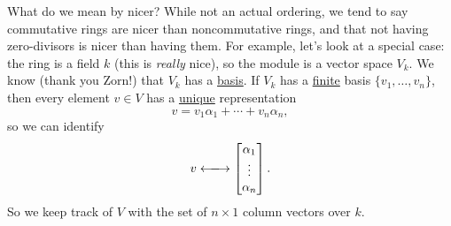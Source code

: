 \documentclass[12pt]{article}
\newcommand{\ita}[1]{\textit{#1}}
\theoremstyle{definition}
\begin{document}
What do we mean by nicer? While not an actual ordering, we tend to say commutative rings are nicer than noncommutative rings, and that not having zero-divisors is nicer than having them. For example, let's look at a special case: the ring is a field $k$ (this is \ita{really} nice), so the module is a vector space $V_k$. We know (thank you Zorn!) that $V_k$ has a \underline{basis}. If $V_k$ has a \underline{finite} basis $\{v_1,\dotsc,v_n\}$, then every element $v\in V$ has a \underline{unique} representation
\begin{equation}
    v=v_1\alpha_1+\dotsb+v_n\alpha_n,
\end{equation}
so we can identify 
\begin{equation}
    v\xlongleftrightarrow{}
    \begin{bmatrix}
        \alpha_1 \\
        \vdots \\
        \alpha_n
    \end{bmatrix}.
\end{equation}
So we keep track of $V$ with the set of $n\times1$ column vectors over $k$.
\end{document}
